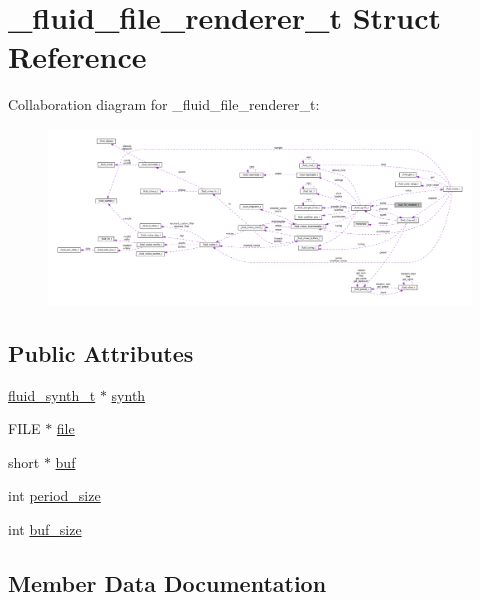 \hypertarget{struct__fluid__file__renderer__t}{}\section{\+\_\+fluid\+\_\+file\+\_\+renderer\+\_\+t Struct Reference}
\label{struct__fluid__file__renderer__t}


Collaboration diagram for \+\_\+fluid\+\_\+file\+\_\+renderer\+\_\+t\+:
\nopagebreak
\begin{figure}[H]
\begin{center}
\leavevmode
\includegraphics[width=350pt]{struct__fluid__file__renderer__t__coll__graph}
\end{center}
\end{figure}
\subsection*{Public Attributes}
\begin{DoxyCompactItemize}
\item 
\hyperlink{types_8h_ae265f10ae174a13afe010de50d87e1a4}{fluid\+\_\+synth\+\_\+t} $\ast$ \hyperlink{struct__fluid__file__renderer__t_abdf1691de523abbf2eeba089a42b4936}{synth}
\item 
F\+I\+LE $\ast$ \hyperlink{struct__fluid__file__renderer__t_aba3edc6f0fec0f35b1deb15886618f0c}{file}
\item 
short $\ast$ \hyperlink{struct__fluid__file__renderer__t_a812f2d6608ca0c7ade52c6907d028108}{buf}
\item 
int \hyperlink{struct__fluid__file__renderer__t_aff4b0588e5bf3f28e26e944b01d61852}{period\+\_\+size}
\item 
int \hyperlink{struct__fluid__file__renderer__t_a868bc700dd3e8fe63c7a9e17594f522b}{buf\+\_\+size}
\end{DoxyCompactItemize}


\subsection{Member Data Documentation}
\mbox{\label{struct__fluid__file__renderer__t_a812f2d6608ca0c7ade52c6907d028108}} 
